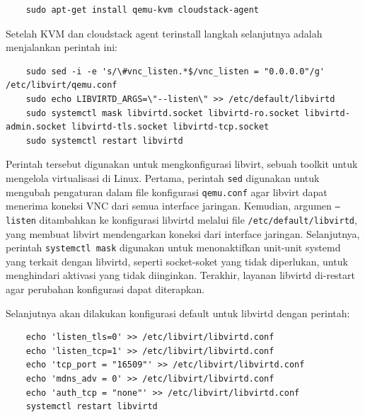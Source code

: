 \begin{verbatim}
    sudo apt-get install qemu-kvm cloudstack-agent
\end{verbatim}

Setelah KVM dan cloudstack agent terinstall langkah selanjutnya adalah menjalankan perintah ini:

\begin{listing}[H]
    \begin{verbatim}
    sudo sed -i -e 's/\#vnc_listen.*$/vnc_listen = "0.0.0.0"/g' /etc/libvirt/qemu.conf
    sudo echo LIBVIRTD_ARGS=\"--listen\" >> /etc/default/libvirtd
    sudo systemctl mask libvirtd.socket libvirtd-ro.socket libvirtd-admin.socket libvirtd-tls.socket libvirtd-tcp.socket
    sudo systemctl restart libvirtd
    \end{verbatim}
\end{listing}

Perintah tersebut digunakan untuk mengkonfigurasi libvirt, sebuah toolkit untuk mengelola virtualisasi di Linux. Pertama, perintah \texttt{sed} digunakan untuk mengubah pengaturan dalam file konfigurasi \texttt{qemu.conf} agar libvirt dapat menerima koneksi VNC dari semua interface jaringan. Kemudian, argumen \texttt{--listen} ditambahkan ke konfigurasi libvirtd melalui file \texttt{/etc/default/libvirtd}, yang membuat libvirt mendengarkan koneksi dari interface jaringan. Selanjutnya, perintah \texttt{systemctl mask} digunakan untuk menonaktifkan unit-unit systemd yang terkait dengan libvirtd, seperti socket-soket yang tidak diperlukan, untuk menghindari aktivasi yang tidak diinginkan. Terakhir, layanan libvirtd di-restart agar perubahan konfigurasi dapat diterapkan.

Selanjutnya akan dilakukan konfigurasi default untuk libvirtd dengan perintah:

\begin{listing}[H]
    \begin{verbatim}
    echo 'listen_tls=0' >> /etc/libvirt/libvirtd.conf
    echo 'listen_tcp=1' >> /etc/libvirt/libvirtd.conf
    echo 'tcp_port = "16509"' >> /etc/libvirt/libvirtd.conf
    echo 'mdns_adv = 0' >> /etc/libvirt/libvirtd.conf
    echo 'auth_tcp = "none"' >> /etc/libvirt/libvirtd.conf
    systemctl restart libvirtd
    \end{verbatim}
\end{listing}

